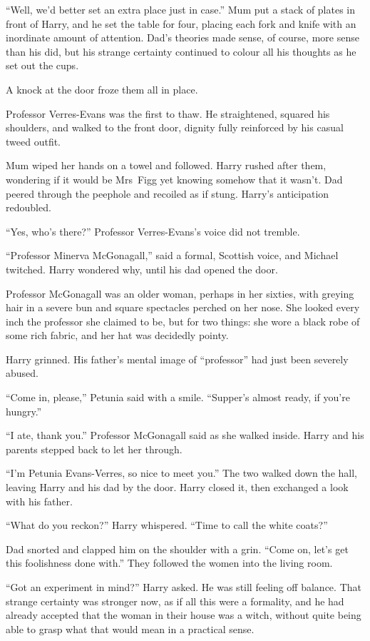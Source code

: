 “Well, we’d better set an extra place just in case.” Mum put a
stack of plates in front of Harry, and he set the table for
four, placing each fork and knife with an inordinate amount
of attention. Dad’s theories made sense, of course, more
sense than his did, but his strange certainty continued to
colour all his thoughts as he set out the cups.

A knock at the door froze them all in place.

Professor Verres-Evans was the first to thaw. He straightened, squared his
shoulders, and walked to the front door, dignity fully
reinforced by his casual tweed outfit.

Mum wiped her hands on a towel and followed. Harry
rushed after them, wondering if it would be Mrs~Figg yet
knowing somehow that it wasn’t. Dad peered through the
peephole and recoiled as if stung. Harry’s anticipation redoubled.

“Yes, who’s there?” Professor Verres-Evans’s voice did not tremble.

“Professor Minerva McGonagall,” said a formal, Scottish
voice, and Michael twitched. Harry wondered why, until his
dad opened the door.

Professor McGonagall was an older woman, perhaps in her
sixties, with greying hair in a severe bun and square
spectacles perched on her nose. She looked every inch
the professor she claimed to be, but for two things: she
wore a black robe of some rich fabric, and her hat was
decidedly pointy.

Harry grinned. His father’s mental image of “professor” had
just been severely abused.

“Come in, please,” Petunia said with a smile. “Supper’s
almost ready, if you’re hungry.”

“I ate, thank you.” Professor McGonagall said as she walked
inside. Harry and his parents stepped back to let her through.

“I’m Petunia Evans-Verres, so nice to meet you.” The two
walked down the hall, leaving Harry and his dad by the
door. Harry closed it, then exchanged a look with his father.

“What do you reckon?” Harry whispered. “Time to call the white coats?”

Dad snorted and clapped him on the shoulder with a grin.
“Come on, let’s get this foolishness done with.” They
followed the women into the living room.

“Got an experiment in mind?” Harry asked. He was still
feeling off balance. That strange certainty was stronger
now, as if all this were a formality, and he had already
accepted that the woman in their house was a witch,
without quite being able to grasp what that would mean in
a practical sense.

